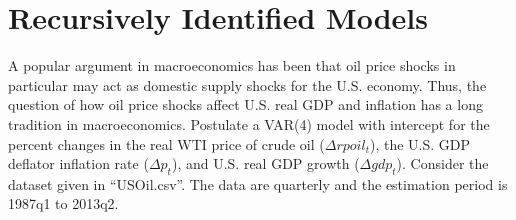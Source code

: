 \section[Recursively Identified Models]{Recursively Identified Models\label{ex:RecursivelyIdentifiedModels}}
A popular argument in macroeconomics has been that oil price shocks in particular may act as domestic supply shocks for the U.S. economy.
Thus, the question of how oil price shocks affect U.S. real GDP and inflation has a long tradition in macroeconomics.
 Postulate a VAR(4) model with intercept for the percent changes in the real WTI price of crude oil (\(\Delta rpoil_t\)),
  the U.S. GDP deflator inflation rate (\(\Delta p_t\)),
  and U.S. real GDP growth (\(\Delta gdp_t\)).
Consider the dataset given in \enquote{USOil.csv}.
The data are quarterly and the estimation period is 1987q1 to 2013q2.

